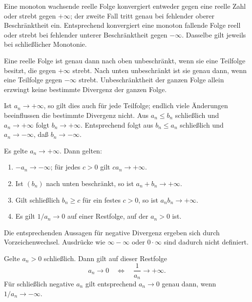 \begin{theorem}
\label{b21guide:thm:monotone-dichotomy}
Eine monoton wachsende reelle Folge konvergiert entweder gegen
eine reelle Zahl oder strebt gegen $+\infty$; der zweite Fall
tritt genau bei fehlender oberer Beschränktheit ein.
Entsprechend konvergiert eine monoton fallende Folge reell
oder strebt bei fehlender unterer Beschränktheit gegen $-\infty$.
Dasselbe gilt jeweils bei schließlicher Monotonie.
\end{theorem}

\begin{theorem}
\label{b21guide:thm:unbounded-subsequence}
Eine reelle Folge ist genau dann nach oben unbeschränkt,
wenn sie eine Teilfolge besitzt, die gegen $+\infty$ strebt.
Nach unten unbeschränkt ist sie genau dann, wenn eine Teilfolge
gegen $-\infty$ strebt.
Unbeschränktheit der ganzen Folge allein erzwingt keine bestimmte
Divergenz der ganzen Folge.
\end{theorem}

\begin{theorem}
Ist $a_n\to+\infty$, so gilt dies auch für jede Teilfolge;
endlich viele Änderungen beeinflussen die bestimmte Divergenz nicht.
Aus $a_n\leq b_n$ schließlich und $a_n\to+\infty$ folgt
$b_n\to+\infty$.
Entsprechend folgt aus $b_n\leq a_n$ schließlich und
$a_n\to-\infty$, daß $b_n\to-\infty$.
\end{theorem}

\begin{theorem}
\label{b21guide:thm:infinite-rules}
Es gelte $a_n\to+\infty$. Dann gelten:
\begin{enumerate}
 \item $-a_n\to-\infty$; für jedes $c>0$ gilt $ca_n\to+\infty$.
 \item Ist $(b_n)$ nach unten beschränkt, so ist
 $a_n+b_n\to+\infty$.
 \item Gilt schließlich $b_n\geq c$ für ein festes $c>0$,
 so ist $a_nb_n\to+\infty$.
 \item Es gilt $1/a_n\to0$ auf einer Restfolge, auf der $a_n>0$ ist.
\end{enumerate}
Die entsprechenden Aussagen für negative Divergenz ergeben sich
durch Vorzeichenwechsel. Ausdrücke wie $\infty-\infty$ oder
$0\cdot\infty$ sind dadurch nicht definiert.
\end{theorem}

\begin{theorem}
Gelte $a_n>0$ schließlich. Dann gilt auf dieser Restfolge
\[
 a_n\to0\quad\Longleftrightarrow\quad\frac1{a_n}\to+\infty.
\]
Für schließlich negative $a_n$ gilt entsprechend
$a_n\to0$ genau dann, wenn $1/a_n\to-\infty$.
\end{theorem}

